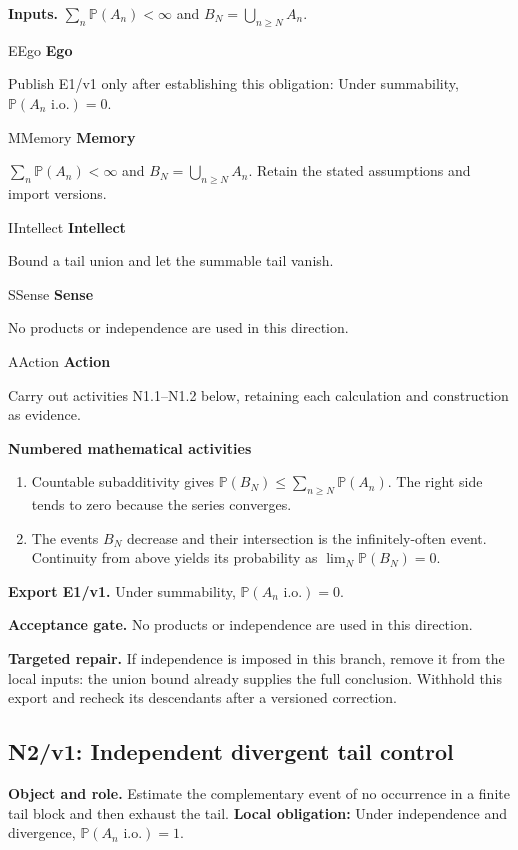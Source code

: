 \documentclass[preprint,12pt,aps,pra,showkeys,amsmath,amssymb,superscriptaddress,floatfix]{revtex4-2}
\theoremstyle{definition}
\theoremstyle{remark}
\newcommand{\mmfaculty}[3]{%
 \begin{mmfacultybox}{#1}{#2}
 {\sffamily\bfseries\color{MMBlue}#2}\par\smallskip #3
 \end{mmfacultybox}}
\newcommand{\field}[2]{\par\smallskip\noindent\textbf{#1.} #2\par}
\begin{document}
\field{Inputs}{\(\sum_n\mathbb P(A_n)<\infty\) and \(B_N=\bigcup_{n\ge N}A_n\).}

\mmfaculty{E}{Ego}{Publish E1/v1 only after establishing this obligation: Under
summability, \(\mathbb P(A_n\text{ i.o.})=0\).}

\mmfaculty{M}{Memory}{\(\sum_n\mathbb P(A_n)<\infty\) and \(B_N=\bigcup_{n\ge N}A_n\). Retain
the stated assumptions and import versions.}

\mmfaculty{I}{Intellect}{Bound a tail union and let the summable tail vanish.}

\mmfaculty{S}{Sense}{No products or independence are used in this direction.}

\mmfaculty{A}{Action}{Carry out activities N1.1--N1.2 below, retaining each calculation and
construction as evidence.}

\smallskip\noindent\textbf{Numbered mathematical activities}

\begin{enumerate}[label=N1.\arabic*,leftmargin=3.4em]

\item Countable subadditivity gives
\(\mathbb P(B_N)\le\sum_{n\ge N}\mathbb P(A_n)\). The right side tends
to zero because the series converges.

\item The events \(B_N\) decrease and their intersection is the
infinitely-often event. Continuity from above yields its probability as
\(\lim_N\mathbb P(B_N)=0\).

\end{enumerate}

\field{Export E1/v1}{Under summability, \(\mathbb P(A_n\text{ i.o.})=0\).}

\field{Acceptance gate}{No products or independence are used in this direction.}

\field{Targeted repair}{If independence is imposed in this branch, remove it from the local
inputs: the union bound already supplies the full conclusion. Withhold
this export and recheck its descendants after a versioned correction.}

\clearpage

\subsection{N2/v1: Independent divergent tail control}

\field{Object and role}{Estimate the complementary event of no occurrence in a finite tail block
and then exhaust the tail. \textbf{Local obligation:} Under independence
and divergence, \(\mathbb P(A_n\text{ i.o.})=1\).}
\end{document}
